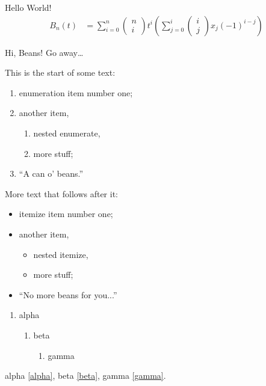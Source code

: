 \documentclass{book}
\begin{document}
Hello World!
\begin{align*}
    B_n(t) &= \sum_{i=0}^{n} \begin{pmatrix} n \\ i \end{pmatrix} t^i
        \left(\sum_{j=0}^{i} \begin{pmatrix} i \\ j \end{pmatrix} x_j(-1)^{i-j}\right)
\end{align*}


\newpagerecto
Hi, Beans!
\newpageverso
Go away\dots

\newpage
This is the start of some text:
\begin{enumerate}
    \item enumeration item number one;
    \item another item,
        \begin{enumerate}
            \item nested enumerate,
            \item more stuff;
        \end{enumerate}
    \item ``A can o' beans.''
\end{enumerate}
More text that follows after it:
\begin{itemize}
    \item itemize item number one;
    \item another item,
        \begin{itemize}
            \item nested itemize,
            \item more stuff;
        \end{itemize}
    \item ``No more beans for you...''
\end{itemize}
\lipsum[2]
\begin{multicols}{2}
    \lipsum[3]
\end{multicols}
\begin{enumerate}
    \item alpha \label{alpha}
        \begin{enumerate}
            \item beta \label{beta}
                \begin{enumerate}
                    \item gamma \label{gamma}
                \end{enumerate}
        \end{enumerate}
\end{enumerate}
alpha \ref{alpha},
beta \ref{beta},
gamma \ref{gamma}.
\end{document}
